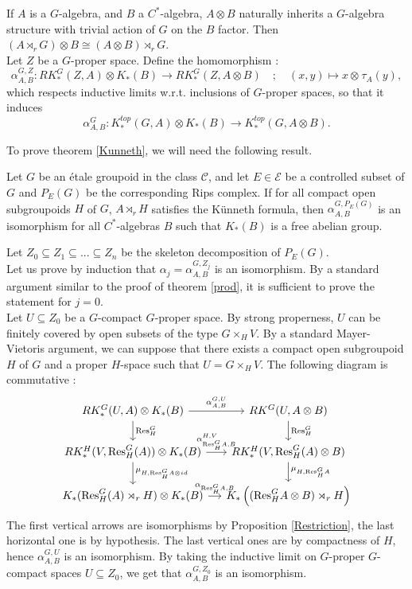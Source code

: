 If $A$ is a $G$-algebra, and $B$ a $C^*$-algebra, $A\otimes B$ naturally inherits a $G$-algebra structure with trivial action of $G$ on the $B$ factor. Then $(A\rtimes_r G)\otimes B \cong (A\otimes B)\rtimes_r G$.\\

Let $Z$ be a $G$-proper space. Define the homomorphism :
\[\alpha_{A,B}^{G,Z} : RK^G_*(Z,A)\otimes K_*(B)\rightarrow RK_*^G(Z,A\otimes B) \quad ; \quad (x,y)\mapsto x\otimes_{}   \tau_A(y),\]
which respects inductive limits w.r.t. inclusions of $G$-proper spaces, so that it induces
\[\alpha_{A,B}^G : K_*^{top}(G,A)\otimes K_*(B)\rightarrow K_*^{top}(G,A\otimes B ).\]

To prove theorem \ref{Kunneth}, we will need the following result.

\begin{thm}\label{TopologicalKunneth}
Let $G$ be an étale groupoid in the class $\mathcal C$, and let $E\in\mathcal E$ be a controlled subset of $G$ and $P_E(G)$ be the corresponding Rips complex. If for all compact open subgroupoids $H$ of $G$, $A\rtimes_r H$ satisfies the Künneth formula, then $\alpha_{A,B}^{G,P_E(G)}$ is an isomorphism for all $C^*$-algebras $B$ such that $K_*(B)$ is a free abelian group.
\end{thm}

\begin{dem}
Let $Z_0\subseteq Z_1\subseteq ... \subseteq Z_n $ be the skeleton decomposition of $P_E(G)$.\\

Let us prove by induction that $\alpha_j=\alpha^{G,Z_j}_{A,B}$ is an isomorphism. By a standard argument similar to the proof of theorem \ref{prod}, it is sufficient to prove the statement for $j=0$.\\

Let $U\subseteq Z_0$ be a $G$-compact $G$-proper space. By strong properness, $U$ can be finitely covered by open subsets of the type $G \times_H V$. By a standard Mayer-Vietoris argument, we can suppose that there exists a compact open subgroupoid $H$ of $G$ and a proper $H$-space such that $U = G \times_H V$. The following diagram is commutative :
\[\begin{tikzcd}[column sep = small] RK_*^G(U,A)\otimes K_*(B) \arrow{r}{\alpha_{A,B}^{G,U}} \arrow{d}{\text{Res}_H^G} & RK^G(U, A\otimes B) \arrow{d}{\text{Res}_H^G}\\
RK_*^H(V, \text{Res}_H^G (A))\otimes K_*(B) \arrow{r}{\alpha_{\text{Res}_H^G A,B}^{H,V}} \arrow{d}{\mu_{H,\text{Res}_H^G A \otimes id}} & 
	RK_*^H(V, \text{Res}_H^G (A)\otimes B)\arrow{d}{\mu_{H,\text{Res}_H^G A }} \\
K_*(\text{Res}_H^G (A)\rtimes_r H)\otimes K_*(B)\arrow{r}{\alpha_{\text{Res}_H^G A,B}} & K_*\left((\text{Res}_H^G A\otimes B)\rtimes_r H\right) 
\end{tikzcd}\]
The first vertical arrows are isomorphisms by Proposition \ref{Restriction}, the last horizontal one is by hypothesis. The last vertical ones are by compactness of $H$, hence $\alpha_{A,B}^{G,U}$ is an isomorphism. By taking the inductive limit on $G$-proper $G$-compact spaces $U\subseteq Z_0$, we get that $\alpha_{A,B}^{G,Z_0}$ is an isomorphism.
\end{dem}

